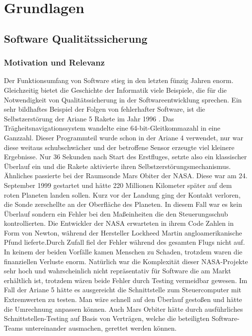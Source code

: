 \chapter{Grundlagen}
\label{sec:fundamentals}
\section{Software Qualitätssicherung}
\subsection{Motivation und Relevanz}

Der Funktionsumfang von Software stieg in den letzten fünzig Jahren enorm. Gleichzeitig bietet die Geschichte der Informatik viele Beispiele, die für die Notwendigkeit von Qualitätssicherung in der Softwareentwicklung sprechen. Ein sehr bildhaftes Beispiel der Folgen von fehlerhafter Software, ist die Selbstzerstörung der Ariane 5 Rakete im Jahr 1996 \cite{giese_warum_2002}. Das Trägheitsnavigationssystem wandelte eine 64-bit-Gleitkommazahl in eine Ganzzahl. Dieser Programmteil wurde schon in der Ariane 4 verwendet, nur war diese weitaus schubschwächer und der betroffene Sensor erzeugte viel kleinere Ergebnisse. Nur 36 Sekunden nach Start des Erstfluges, setzte also ein klassischer Überlauf ein und die Rakete aktivierte ihren Selbstzerstörungsmechanismus.
Ähnliches passierte bei der Raumsonde Mars Obiter der NASA. Diese war am 24. September 1999 gestartet und hätte 220 Millionen Kilometer später auf dem roten Planeten landen sollen. Kurz vor der Landung ging der Kontakt verloren, die Sonde zerschellte an der Oberfläche des Planeten. In diesem Fall war es kein Überlauf sondern ein Fehler bei den Maßeinheiten die den Steuerungsschub kontrollierten. Die Entwickler der NASA erwarteten in ihrem Code Zahlen in Form von Newton, während der Hersteller Lockheed Martin angloamerikanische Pfund lieferte.Durch Zufall fiel der Fehler während des gesamten Flugs nicht auf. \cite{thaller_software-test:_2002}
In keinem der beiden Vorfälle kamen Menschen zu Schaden, trotzdem waren die finanziellen Verluste enorm. Natürlich war die Komplexität dieser NASA-Projekte sehr hoch und wahrscheinlich nicht repräsentativ für Software die am Markt erhältlich ist, trotzdem wären beide Fehler durch Testing vermeidbar gewesen. Im Fall der Ariane 5 hätte es ausgereicht die Schnittstelle zum Steuercomputer mit Extremwerten zu testen. Man wäre schnell auf den Überlauf gestoßen und hätte die Umrechnung anpassen können. Auch Mars Orbiter hätte durch ausführliches Schnittstellen-Testing auf Basis von Verträgen, welche die beteiligten Software-Teams untereinander ausmachen, gerettet werden können.

